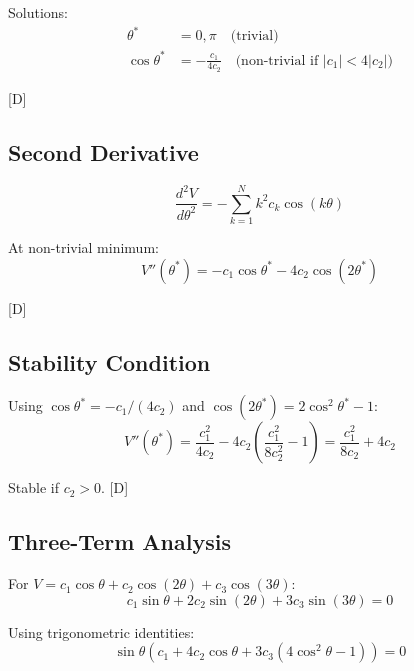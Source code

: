 \documentclass[11pt,a4paper]{article}
\newcommand{\tagD}{\textcolor{blue!70!black}{[D]}}
\begin{document}
Solutions:
\begin{align}
\label{eq:sol-trivial}
\theta^* &= 0, \pi \quad \text{(trivial)} \\
\label{eq:sol-nontrivial}
\cos\theta^* &= -\frac{c_1}{4c_2} \quad \text{(non-trivial if } |c_1| < 4|c_2|\text{)}
\end{align}

\tagD

\subsection{Second Derivative}

\begin{equation}
\label{eq:second-deriv}
\frac{d^2V}{d\theta^2} = -\sum_{k=1}^{N} k^2 c_k \cos(k\theta)
\end{equation}

At non-trivial minimum:
\begin{equation}
\label{eq:second-at-min}
V''(\theta^*) = -c_1 \cos\theta^* - 4c_2 \cos(2\theta^*)
\end{equation}

\tagD

\subsection{Stability Condition}

Using $\cos\theta^* = -c_1/(4c_2)$ and $\cos(2\theta^*) = 2\cos^2\theta^* - 1$:
\begin{equation}
\label{eq:stability}
V''(\theta^*) = \frac{c_1^2}{4c_2} - 4c_2 \left(\frac{c_1^2}{8c_2^2} - 1\right) = \frac{c_1^2}{8c_2} + 4c_2
\end{equation}

Stable if $c_2 > 0$. \tagD

\subsection{Three-Term Analysis}

For $V = c_1\cos\theta + c_2\cos(2\theta) + c_3\cos(3\theta)$:
\begin{equation}
\label{eq:three-term-ext}
c_1\sin\theta + 2c_2\sin(2\theta) + 3c_3\sin(3\theta) = 0
\end{equation}

Using trigonometric identities:
\begin{equation}
\label{eq:three-term-expand}
\sin\theta(c_1 + 4c_2\cos\theta + 3c_3(4\cos^2\theta - 1)) = 0
\end{equation}
\end{document}
